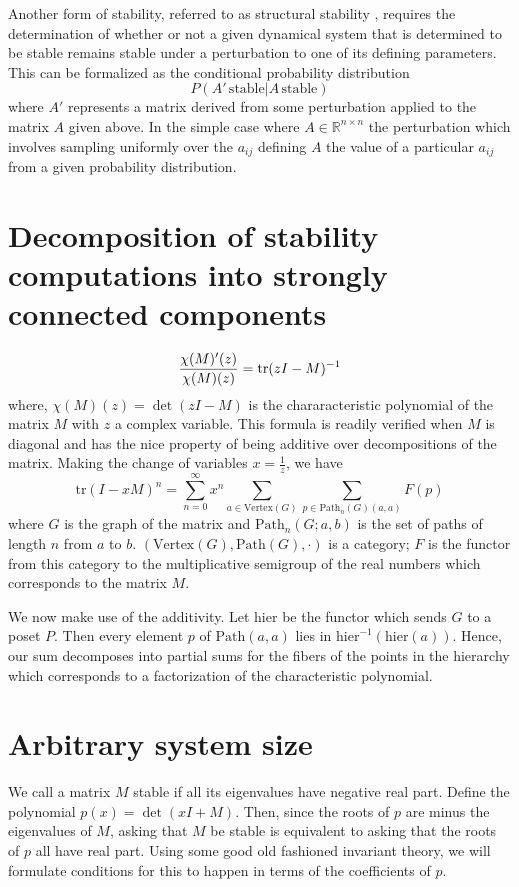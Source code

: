 \documentclass{amsart}
\theoremstyle{definition}
\theoremstyle{remark}
\numberwithin{equation}{section}
\def\tr{\mathrm{tr}}
\def\Path{\mathrm{Path}}
\def\hier{\mathrm{hier}}
\def\Vertex{\mathrm{Vertex}}
\begin{document}
Another form of stability, referred to as structural stability \cite{Smale1967}, requires the determination of whether or not a given dynamical system that is determined to be stable remains stable under a perturbation to one of its defining parameters. This can be formalized as the conditional probability distribution
$$
P(A' \, \textrm{stable} | A \, \textrm{stable})
$$
where $A'$ represents a matrix derived from some perturbation applied to the matrix $A$ given above. In the simple case where $A \in \mathbb{R}^{n \times n}$ the perturbation which involves sampling uniformly over the $a_{ij}$ defining $A$ the value of a particular $a_{ij}$ from a given probability distribution.

\section{Decomposition of stability computations into strongly connected components}
$${\chi(M)'(z) \over \chi(M)(z)} = \tr (zI - M)^{-1}$$
where, $\chi(M)(z) = \det (zI - M)$ is the chararacteristic polynomial of
the matrix $M$ with $z$ a complex variable.  This formula is readily
verified when $M$ is diagonal and has the nice property of being
additive over decompositions of the matrix. Making the change of variables $x=\frac{1}{z}$, we have
$$\tr (I - xM)^n = \sum_{n=0}^\infty x^n \sum_{a \in \Vertex(G)} \sum_{p
\in \Path_n (G)(a,a)} F(p)$$
where $G$ is the graph of the matrix and $\Path_n (G;a,b)$ is the set of
paths of length $n$ from $a$ to $b$.  $(\Vertex(G), \Path(G), \cdot)$ is a category; $F$ is the functor from this category to the multiplicative semigroup of the real numbers which corresponds to the matrix $M$.

We now make use of the additivity.  Let $\hier$ be the functor which
sends $G$ to a poset $P$.  Then every element $p$ of $\Path(a,a)$ lies
in $\hier^{-1} (\hier(a))$.  Hence, our sum decomposes into partial sums
for the fibers of the points in the hierarchy which corresponds to a
factorization of the characteristic polynomial.


\section{Arbitrary system size}
We call a matrix $M$ stable if all its eigenvalues have negative real
part.  Define the polynomial $p(x) = \det(xI + M)$.  Then, since the
roots of $p$ are minus the eigenvalues of $M$, asking that $M$ be
stable is equivalent to asking that the roots of $p$ all have real
part.  Using some good old fashioned invariant theory, we will
formulate conditions for this to happen in terms of the coefficients of
$p$.
\end{document}
